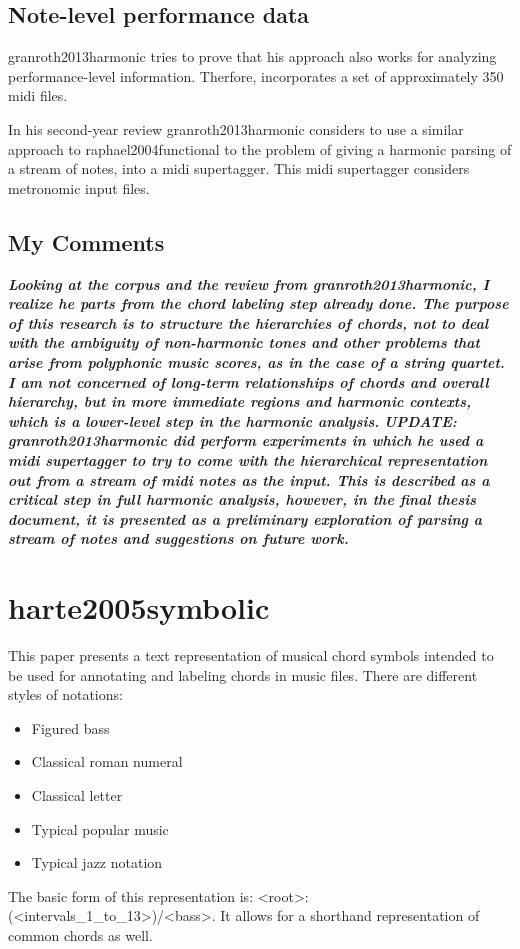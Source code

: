   \subsection{Note-level performance data}
    granroth2013harmonic tries to prove that his approach also works for analyzing performance-level information. Therfore, incorporates a set of approximately 350 midi files.

    In his second-year review granroth2013harmonic considers to use a similar approach to raphael2004functional to the problem of giving a harmonic parsing of a stream of notes, into a midi supertagger. This midi supertagger considers metronomic input files.

  \subsection{My Comments}
    \emph{\textbf{Looking at the corpus and the review from granroth2013harmonic, I realize he parts from the chord labeling step already done. The purpose of this research is to structure the hierarchies of chords, not to deal with the ambiguity of non-harmonic tones and other problems that arise from polyphonic music scores, as in the case of a string quartet. I am not concerned of long-term relationships of chords and overall hierarchy, but in more immediate regions and harmonic contexts, which is a lower-level step in the harmonic analysis.
    }}
    \emph{\textbf{UPDATE: granroth2013harmonic did perform experiments in which he used a midi supertagger to try to come with the hierarchical representation out from a stream of midi notes as the input. This is described as a critical step in full harmonic analysis, however, in the final thesis document, it is presented as a preliminary exploration of parsing a stream of notes and suggestions on future work.}}

\section{harte2005symbolic }
  This paper presents a text representation of musical chord symbols intended to be used for annotating and labeling chords in music files.
  There are different styles of notations:
  \begin{itemize}
    \item Figured bass
    \item Classical roman numeral
    \item Classical letter
    \item Typical popular music
    \item Typical jazz notation
  \end{itemize}
  The basic form of this representation is: <root>:(<intervals\_1\_to\_13>)/<bass>. It allows for a shorthand representation of common chords as well.
